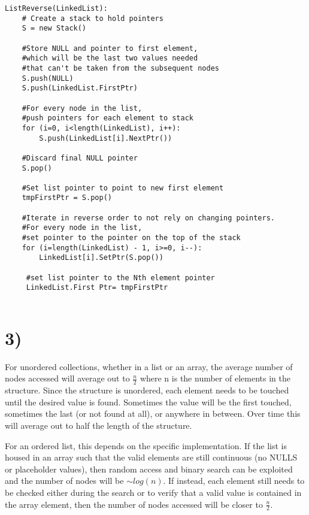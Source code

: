\documentclass[a4paper,11pt]{article}
\begin{document}
\begin{verbatim}
ListReverse(LinkedList):
    # Create a stack to hold pointers
    S = new Stack()
    
    #Store NULL and pointer to first element,
    #which will be the last two values needed
    #that can't be taken from the subsequent nodes
    S.push(NULL)
    S.push(LinkedList.FirstPtr)
    
    #For every node in the list, 
    #push pointers for each element to stack
    for (i=0, i<length(LinkedList), i++):
        S.push(LinkedList[i].NextPtr()) 
    
    #Discard final NULL pointer
    S.pop() 
    
    #Set list pointer to point to new first element
    tmpFirstPtr = S.pop()
    
    #Iterate in reverse order to not rely on changing pointers.
    #For every node in the list, 
    #set pointer to the pointer on the top of the stack
    for (i=length(LinkedList) - 1, i>=0, i--):
        LinkedList[i].SetPtr(S.pop())
        
     #set list pointer to the Nth element pointer
     LinkedList.First Ptr= tmpFirstPtr
     
\end{verbatim}


\section*{3)} 
For unordered collections, whether in a list or an array, the average number of nodes accessed will average out to $\frac{n}{2}$ where n is the number of elements in the structure.  Since the structure is unordered, each element needs to be touched until the desired value is found.  Sometimes the value will be the first touched, sometimes the last (or not found at all), or anywhere in between.  Over time this will average out to half the length of the structure.

For an ordered list, this depends on the specific implementation. If the list is housed in an array such that the valid elements are still continuous (no NULLS or placeholder values), then random access and binary search can be exploited and the number of nodes will be $\sim log(n)$.  If instead, each element still needs to be checked either during the search or to verify that a valid value is contained in the array element, then the number of nodes accessed will be closer to $\frac{n}{2}$.
\end{document}
